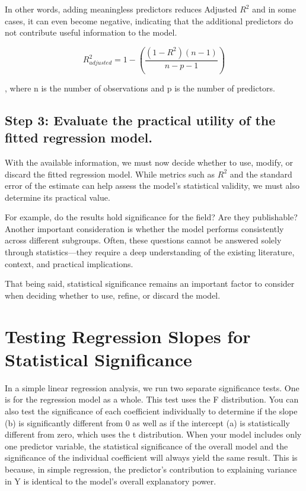 \documentclass[
  letterpaper,
  DIV=11,
  numbers=noendperiod]{scrreprt}
\begin{document}
In other words, adding meaningless predictors reduces Adjusted \(R^2\)
and in some cases, it can even become negative, indicating that the
additional predictors do not contribute useful information to the model.

\[
R^2_{adjusted} = 1 - \left( \frac{(1 - R^2)(n - 1)}{n - p - 1} \right)
\]

, where n is the number of observations and p is the number of
predictors.

\subsection*{Step 3: Evaluate the practical utility of the fitted
regression
model.}\label{step-3-evaluate-the-practical-utility-of-the-fitted-regression-model.}

With the available information, we must now decide whether to use,
modify, or discard the fitted regression model. While metrics such as
\(R^2\) and the standard error of the estimate can help assess the
model's statistical validity, we must also determine its practical
value.

For example, do the results hold significance for the field? Are they
publishable? Another important consideration is whether the model
performs consistently across different subgroups. Often, these questions
cannot be answered solely through statistics---they require a deep
understanding of the existing literature, context, and practical
implications.

That being said, statistical significance remains an important factor to
consider when deciding whether to use, refine, or discard the model.

\section{Testing Regression Slopes for Statistical
Significance}\label{testing-regression-slopes-for-statistical-significance}

In a simple linear regression analysis, we run two separate significance
tests. One is for the regression model as a whole. This test uses the F
distribution. You can also test the significance of each coefficient
individually to determine if the slope (b) is significantly different
from 0 as well as if the intercept (a) is statistically different from
zero, which uses the t distribution. When your model includes only one
predictor variable, the statistical significance of the overall model
and the significance of the individual coefficient will always yield the
same result. This is because, in simple regression, the predictor's
contribution to explaining variance in Y is identical to the model's
overall explanatory power.
\end{document}
